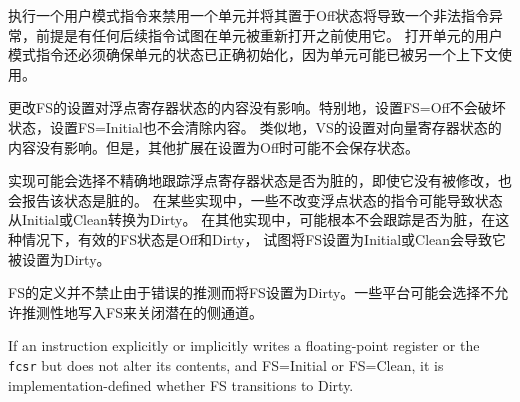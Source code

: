 执行一个用户模式指令来禁用一个单元并将其置于Off状态将导致一个非法指令异常，前提是有任何后续指令试图在单元被重新打开之前使用它。
打开单元的用户模式指令还必须确保单元的状态已正确初始化，因为单元可能已被另一个上下文使用。


更改FS的设置对浮点寄存器状态的内容没有影响。特别地，设置FS=Off不会破坏状态，设置FS=Initial也不会清除内容。
类似地，VS的设置对向量寄存器状态的内容没有影响。但是，其他扩展在设置为Off时可能不会保存状态。


实现可能会选择不精确地跟踪浮点寄存器状态是否为脏的，即使它没有被修改，也会报告该状态是脏的。
在某些实现中，一些不改变浮点状态的指令可能导致状态从Initial或Clean转换为Dirty。
在其他实现中，可能根本不会跟踪是否为脏，在这种情况下，有效的FS状态是Off和Dirty，
试图将FS设置为Initial或Clean会导致它被设置为Dirty。

\iffalse
\begin{commentary}
This definition of FS does not disallow setting FS to Dirty as a result of
errant speculation.  Some platforms may choose to disallow speculatively
writing FS to close a potential side channel.
\end{commentary}
\fi

\begin{commentary}
FS的定义并不禁止由于错误的推测而将FS设置为Dirty。一些平台可能会选择不允许推测性地写入FS来关闭潜在的侧通道。
\end{commentary}

\iffalse
If an instruction explicitly or implicitly writes a floating-point register or
the {\tt fcsr} but does not alter its contents, and FS=Initial or FS=Clean, it
is implementation-defined whether FS transitions to Dirty.

